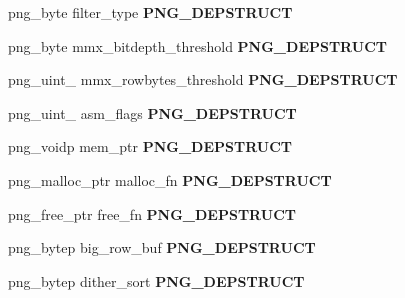 \begin{DoxyCompactItemize}
\item 
\hypertarget{structpng__struct__def_aad67219e17d8f8593d0dd6e31c404c04}{png\-\_\-byte filter\-\_\-type {\bfseries P\-N\-G\-\_\-\-D\-E\-P\-S\-T\-R\-U\-C\-T}}\label{structpng__struct__def_aad67219e17d8f8593d0dd6e31c404c04}

\item 
\hypertarget{structpng__struct__def_a3d1d825e5494c77085eed24e497a8c81}{png\-\_\-byte mmx\-\_\-bitdepth\-\_\-threshold {\bfseries P\-N\-G\-\_\-\-D\-E\-P\-S\-T\-R\-U\-C\-T}}\label{structpng__struct__def_a3d1d825e5494c77085eed24e497a8c81}

\item 
\hypertarget{structpng__struct__def_a477dcaa919e783f012a8079b8ad3b199}{png\-\_\-uint\-\_ mmx\-\_\-rowbytes\-\_\-threshold {\bfseries P\-N\-G\-\_\-\-D\-E\-P\-S\-T\-R\-U\-C\-T}}\label{structpng__struct__def_a477dcaa919e783f012a8079b8ad3b199}

\item 
\hypertarget{structpng__struct__def_acc71c118a787e3283908f1620d2cc16a}{png\-\_\-uint\-\_ asm\-\_\-flags {\bfseries P\-N\-G\-\_\-\-D\-E\-P\-S\-T\-R\-U\-C\-T}}\label{structpng__struct__def_acc71c118a787e3283908f1620d2cc16a}

\item 
\hypertarget{structpng__struct__def_abd744f5ad3c910a8a76fa4bed411fbe3}{png\-\_\-voidp mem\-\_\-ptr {\bfseries P\-N\-G\-\_\-\-D\-E\-P\-S\-T\-R\-U\-C\-T}}\label{structpng__struct__def_abd744f5ad3c910a8a76fa4bed411fbe3}

\item 
\hypertarget{structpng__struct__def_a7e20a9bc74a66cdcf372ecb0d568bbf9}{png\-\_\-malloc\-\_\-ptr malloc\-\_\-fn {\bfseries P\-N\-G\-\_\-\-D\-E\-P\-S\-T\-R\-U\-C\-T}}\label{structpng__struct__def_a7e20a9bc74a66cdcf372ecb0d568bbf9}

\item 
\hypertarget{structpng__struct__def_ac5f9e88287ca9a998096c176898c65aa}{png\-\_\-free\-\_\-ptr free\-\_\-fn {\bfseries P\-N\-G\-\_\-\-D\-E\-P\-S\-T\-R\-U\-C\-T}}\label{structpng__struct__def_ac5f9e88287ca9a998096c176898c65aa}

\item 
\hypertarget{structpng__struct__def_aa9b91853a306e36765e314b68fe5c401}{png\-\_\-bytep big\-\_\-row\-\_\-buf {\bfseries P\-N\-G\-\_\-\-D\-E\-P\-S\-T\-R\-U\-C\-T}}\label{structpng__struct__def_aa9b91853a306e36765e314b68fe5c401}

\item 
\hypertarget{structpng__struct__def_ac5f4b48eb02940f5647fd09c5d65043a}{png\-\_\-bytep dither\-\_\-sort {\bfseries P\-N\-G\-\_\-\-D\-E\-P\-S\-T\-R\-U\-C\-T}}\label{structpng__struct__def_ac5f4b48eb02940f5647fd09c5d65043a}


\end{DoxyCompactItemize}
